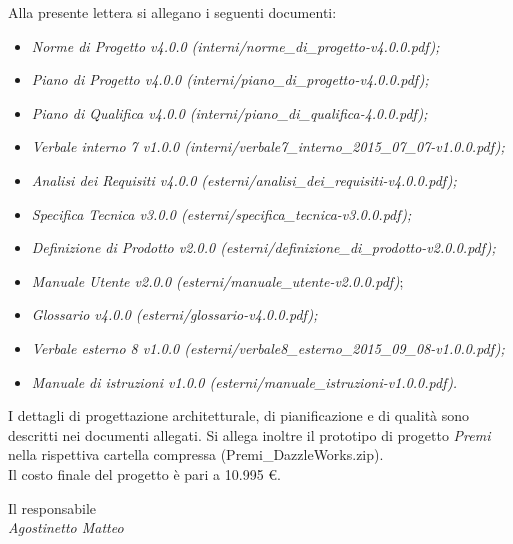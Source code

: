 \noindent Alla presente lettera si allegano i seguenti documenti:
\begin{itemize}
	\item \textit{Norme di Progetto v4.0.0 (interni/norme\_di\_progetto-v4.0.0.pdf);}
	\item \textit{Piano di Progetto v4.0.0 (interni/piano\_di\_progetto-v4.0.0.pdf);}
	\item \textit{Piano di Qualifica v4.0.0 (interni/piano\_di\_qualifica-4.0.0.pdf);}
	\item \textit{Verbale interno 7 v1.0.0 (interni/verbale7\_interno\_2015\_07\_07-v1.0.0.pdf);} 
	\item \textit{Analisi dei Requisiti v4.0.0 (esterni/analisi\_dei\_requisiti-v4.0.0.pdf);}
	\item \textit{Specifica Tecnica v3.0.0 (esterni/specifica\_tecnica-v3.0.0.pdf);}
	\item \textit{Definizione di Prodotto v2.0.0 (esterni/definizione\_di\_prodotto-v2.0.0.pdf);}
	\item \textit{Manuale Utente v2.0.0 (esterni/manuale\_utente-v2.0.0.pdf)};
	\item \textit{Glossario v4.0.0 (esterni/glossario-v4.0.0.pdf);}
	\item \textit{Verbale esterno 8 v1.0.0 (esterni/verbale8\_esterno\_2015\_09\_08-v1.0.0.pdf);}
	\item \textit{Manuale di istruzioni v1.0.0 (esterni/manuale\_istruzioni-v1.0.0.pdf).}\\
\end{itemize}
I dettagli di progettazione architetturale, di pianificazione e di qualità sono descritti nei documenti allegati.
Si allega inoltre il prototipo di progetto \textit{Premi} nella rispettiva cartella compressa (Premi\_DazzleWorks.zip).\\

\noindent Il costo finale del progetto è pari a 10.995 €.

\begin{flushright}
	Il responsabile\\
	\textit{Agostinetto Matteo}
\end{flushright}